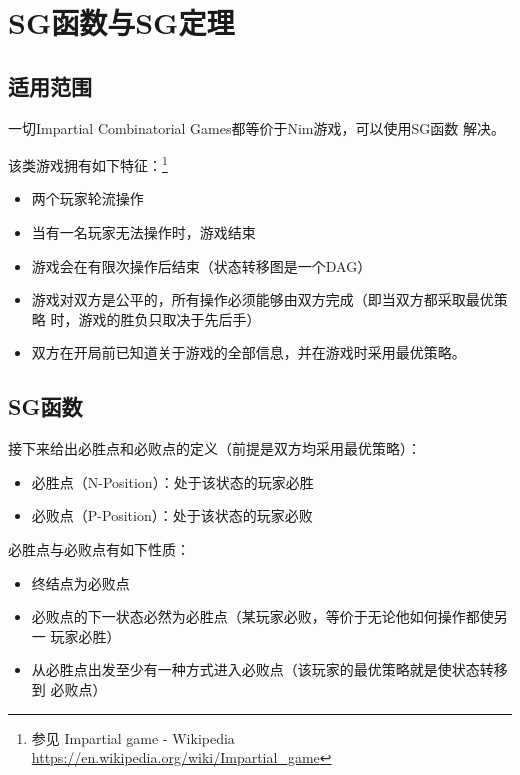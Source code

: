 \section{SG函数与SG定理}

\subsection{适用范围}

一切Impartial Combinatorial Games都等价于Nim游戏，可以使用SG函数
解决。

该类游戏拥有如下特征：\footnote{参见 Impartial game - Wikipedia
	\url{https://en.wikipedia.org/wiki/Impartial_game}}

\begin{itemize}

	\item 两个玩家轮流操作
	\item 当有一名玩家无法操作时，游戏结束
	\item 游戏会在有限次操作后结束（状态转移图是一个DAG）
	\item 游戏对双方是公平的，所有操作必须能够由双方完成（即当双方都采取最优策略
	      时，游戏的胜负只取决于先后手）
	\item 双方在开局前已知道关于游戏的全部信息，并在游戏时采用最优策略。

\end{itemize}

\subsection{SG函数}

接下来给出必胜点和必败点的定义（前提是双方均采用最优策略）：

\begin{itemize}
	\item 必胜点（N-Position）：处于该状态的玩家必胜
	\item 必败点（P-Position）：处于该状态的玩家必败
\end{itemize}

必胜点与必败点有如下性质：

\begin{itemize}
	\item \begin{property}
		      终结点为必败点
	      \end{property}
	\item \begin{property}
		      必败点的下一状态必然为必胜点（某玩家必败，等价于无论他如何操作都使另一
		      玩家必胜）
	      \end{property}
	\item \begin{property}
		      从必胜点出发至少有一种方式进入必败点（该玩家的最优策略就是使状态转移到
		      必败点）
	      \end{property}
\end{itemize}

